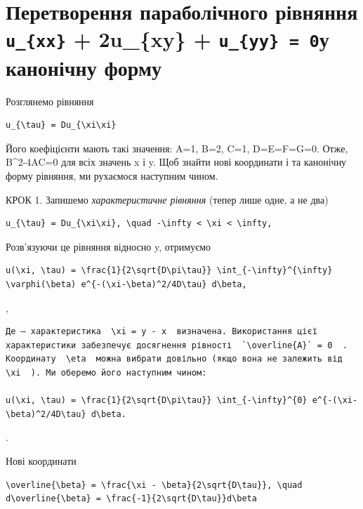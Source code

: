\documentclass[
  ukrainian,
]{article}
\begin{document}
\section{\texorpdfstring{Перетворення параболічного рівняння
\texttt{u\_\{xx\}} + 2u\_\{xy\} + \texttt{u\_\{yy\}\ =\ 0}у канонічну
форму}{Перетворення параболічного рівняння u\_\{xx\} + 2u\_\{xy\} + u\_\{yy\} = 0у канонічну форму}}\label{ux43fux435ux440ux435ux442ux432ux43eux440ux435ux43dux43dux44f-ux43fux430ux440ux430ux431ux43eux43bux456ux447ux43dux43eux433ux43e-ux440ux456ux432ux43dux44fux43dux43dux44f-u_xx-2u_xy-u_yy-0ux443-ux43aux430ux43dux43eux43dux456ux447ux43dux443-ux444ux43eux440ux43cux443}

Розглянемо рівняння

\begin{verbatim}
u_{\tau} = Du_{\xi\xi}
\end{verbatim}

Його коефіцієнти мають такі значення: A=1, B=2, C=1, D=E=F=G=0. Отже,
B\^{}2-4AC=0 для всіх значень x і y. Щоб знайти нові координати \xi  і
\eta  та канонічну форму рівняння, ми рухаємося наступним чином.

КРОК 1. Запишемо \emph{характеристичне рівняння} (тепер лише одне, а не
два)

\begin{verbatim}
u_{\tau} = Du_{\xi\xi}, \quad -\infty < \xi < \infty,
\end{verbatim}

Розв'язуючи це рівняння відносно y, отримуємо

\begin{verbatim}
u(\xi, \tau) = \frac{1}{2\sqrt{D\pi\tau}} \int_{-\infty}^{\infty} \varphi(\beta) e^{-(\xi-\beta)^2/4D\tau} d\beta,
\end{verbatim}

,

\begin{verbatim}
Де — характеристика  \xi = y - x  визначена. Використання цієї характеристики забезпечує досягнення рівності  `\overline{A}` = 0  . Координату  \eta  можна вибрати довільно (якщо вона не залежить від  \xi  ). Ми оберемо його наступним чином:

u(\xi, \tau) = \frac{1}{2\sqrt{D\pi\tau}} \int_{-\infty}^{0} e^{-(\xi-\beta)^2/4D\tau} d\beta.
\end{verbatim}

.

Нові координати

\begin{verbatim}
\overline{\beta} = \frac{\xi - \beta}{2\sqrt{D\tau}}, \quad d\overline{\beta} = \frac{-1}{2\sqrt{D\tau}}d\beta
\end{verbatim}
\end{document}

